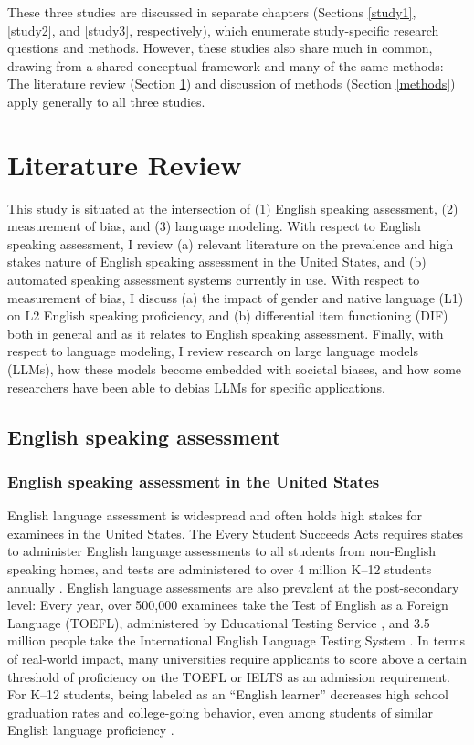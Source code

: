 \documentclass [PhD] {uclathes}
\begin{document}
These three studies are discussed in separate chapters (Sections \ref{study1}, \ref{study2}, and \ref{study3}, respectively), which enumerate study-specific research questions and methods. However, these studies also share much in common, drawing from a shared conceptual framework and many of the same methods: The literature review (Section \ref{litreview}) and discussion of methods (Section \ref{methods}) apply generally to all three studies. 



\chapter{Literature Review}
\label{litreview}

This study is situated at the intersection of (1) English speaking assessment, (2) measurement of bias, and (3) language modeling. With respect to English speaking assessment, I review (a) relevant literature on the prevalence and high stakes nature of English speaking assessment in the United States, and (b) automated speaking assessment systems currently in use. With respect to measurement of bias, I discuss (a) the impact of gender and native language (L1) on L2 English speaking proficiency, and (b) differential item functioning (DIF) both in general and as it relates to English speaking assessment. Finally, with respect to language modeling, I review research on large language models (LLMs), how these models become embedded with societal biases, and how some researchers have been able to debias LLMs for specific applications.

\section{English speaking assessment}

\subsection{English speaking assessment in the United States}
\label{englishspeaking}

English language assessment is widespread and often holds high stakes for examinees in the United States. The Every Student Succeeds Acts \citep{essa2015} requires states to administer English language assessments to all students from non-English speaking homes, and tests are administered to over 4 million K–12 students annually \citep{irwin2021report}. English language assessments are also prevalent at the post-secondary level: Every year, over 500,000 examinees take the Test of English as a Foreign Language (TOEFL), administered by Educational Testing Service \citep{ets2005}, and 3.5 million people take the International English Language Testing System \citep[IELTS;][]{ielts2023}. In terms of real-world impact, many universities require applicants to score above a certain threshold of proficiency on the TOEFL or IELTS as an admission requirement. For K–12 students, being labeled as an “English learner” decreases high school graduation rates and college-going behavior, even among students of similar English language proficiency \citep{johnson2019effects}.
\end{document}
